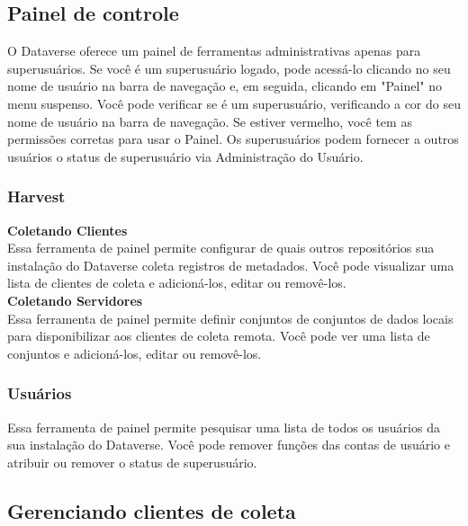 \documentclass[12pt,hidelinks]{article}
\begin{document}
    \subsection{Painel de controle}
    
\qquad O Dataverse oferece um painel de ferramentas administrativas apenas para  \\superusuários. Se você é um superusuário logado, pode acessá-lo clicando no seu nome de usuário na barra de navegação e, em seguida, clicando em "Painel" no menu suspenso. Você pode verificar se é um superusuário, verificando a cor do seu nome de usuário na barra de navegação. Se estiver vermelho, você tem as permissões corretas para usar o Painel. Os superusuários podem fornecer a outros usuários o status de superusuário via Administração do Usuário.

\subsubsection{Harvest}

\qquad\textbf{Coletando Clientes}\\

Essa ferramenta de painel permite configurar de quais outros repositórios sua \\instalação do Dataverse coleta registros de metadados. Você pode visualizar uma lista de clientes de coleta e adicioná-los, editar ou removê-los.\\

\textbf{Coletando Servidores}\\

Essa ferramenta de painel permite definir conjuntos de conjuntos de dados locais para disponibilizar aos clientes de coleta remota. Você pode ver uma lista de conjuntos e adicioná-los, editar ou removê-los.

\subsubsection{Usuários}

\qquad Essa ferramenta de painel permite pesquisar uma lista de todos os usuários da sua instalação do Dataverse. Você pode remover funções das contas de usuário e atribuir ou remover o status de superusuário.

\subsection{Gerenciando clientes de coleta}
\end{document}
